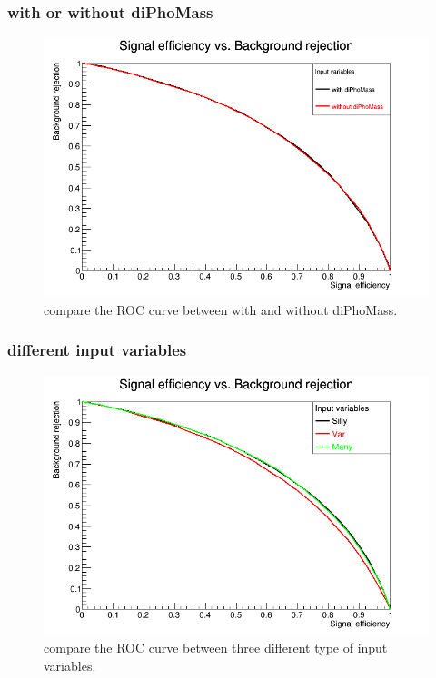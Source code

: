 \documentclass{beamer}
\begin{document}
\begin{frame}
\frametitle{with or without diPhoMass }
\begin{figure}
\includegraphics[scale=0.25]{./figures/ROC_Curve_diphomass.png}
\caption{compare the ROC curve between with and without diPhoMass.}
\end{figure}
\end{frame}

\begin{frame}
\frametitle{different input variables}
\begin{figure}
\includegraphics[scale=0.25]{./figures/ROC_Curve3.png}
\caption{compare the ROC curve between three different type of input variables.}
\end{figure}
\end{frame}
\end{document}
